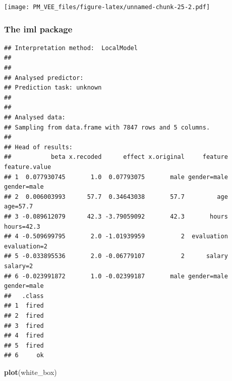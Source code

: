 \documentclass[]{krantz}
\newenvironment{Shaded}{\begin{snugshade}}{\end{snugshade}}
\newcommand{\DataTypeTok}[1]{\textcolor[rgb]{0.13,0.29,0.53}{#1}}
\newcommand{\DecValTok}[1]{\textcolor[rgb]{0.00,0.00,0.81}{#1}}
\newcommand{\KeywordTok}[1]{\textcolor[rgb]{0.13,0.29,0.53}{\textbf{#1}}}
\newcommand{\NormalTok}[1]{#1}
\newcommand{\OperatorTok}[1]{\textcolor[rgb]{0.81,0.36,0.00}{\textbf{#1}}}
\newcommand{\StringTok}[1]{\textcolor[rgb]{0.31,0.60,0.02}{#1}}
\theoremstyle{definition}
\theoremstyle{definition}
\theoremstyle{definition}
\theoremstyle{remark}
\begin{document}
\texttt{[image: PM\_VEE\_files/figure-latex/unnamed-chunk-25-2.pdf]}

\hypertarget{the-iml-package}{%
\subsubsection{\texorpdfstring{\textbf{The iml
package}}{The iml package}}\label{the-iml-package}}

\begin{Shaded}
\end{Shaded}

\begin{verbatim}
## Interpretation method:  LocalModel 
## 
## 
## Analysed predictor: 
## Prediction task: unknown 
## 
## 
## Analysed data:
## Sampling from data.frame with 7847 rows and 5 columns.
## 
## Head of results:
##           beta x.recoded      effect x.original     feature feature.value
## 1  0.077930745       1.0  0.07793075       male gender=male   gender=male
## 2  0.006003993      57.7  0.34643038       57.7         age      age=57.7
## 3 -0.089612079      42.3 -3.79059092       42.3       hours    hours=42.3
## 4 -0.509699795       2.0 -1.01939959          2  evaluation  evaluation=2
## 5 -0.033895536       2.0 -0.06779107          2      salary      salary=2
## 6 -0.023991872       1.0 -0.02399187       male gender=male   gender=male
##   .class
## 1  fired
## 2  fired
## 3  fired
## 4  fired
## 5  fired
## 6     ok
\end{verbatim}

\begin{Shaded}
\begin{Highlighting}[]
\KeywordTok{plot}\NormalTok{(white_box)}
\end{Highlighting}
\end{Shaded}
\end{document}
